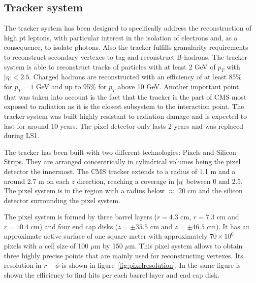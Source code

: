 \subsection{Tracker system}
\label{sec:tracker}

The tracker system has been designed to specifically address the reconstruction of high pt leptons, with particular interest in the isolation of electrons and, as a consequence, to isolate photons. Also the tracker fulfills granularity requirements to reconstruct secondary vertexes to tag and reconstruct B-hadrons. The tracker system is able to reconstruct tracks of particles with at least 2 GeV of $p_{T}$ with $|\eta|<2.5$. Charged hadrons are reconstructed with an efficiency of at least 85\% for $p_{T}=1$ GeV and up to 95\% for $p_{T}$ above 10 GeV. Another important point that was taken into account is the fact that the tracker is the part of CMS most exposed to radiation as it is the closest subsystem to the interaction point. The tracker system was built highly resistant to radiation damage and is expected to last for around 10 years. The pixel detector only lasts 2 years and was replaced during LS1. 

The tracker has been built with two different technologies: Pixels and Silicon Strips. They are arranged concentrically in cylindrical volumes being the pixel detector the innermost. The CMS tracker extends to a radius of 1.1 m and a around 2.7 m on each $z$ direction, reaching a coverage in $|\eta|$ between 0 and 2.5. The pixel system is in the region with a radius below $\approx$ 20 cm and the silicon detector surrounding the pixel system. %

The pixel system is formed by three barrel layers ($r=4.3$ cm, $r=7.3$ cm and $r=10.4$ cm) and four end cap disks ($z=\pm 35.5$ cm and $z=\pm 46.5$ cm). It has an approximate active surface of one square meter with approximately $70\times10^{6}$ pixels with a cell size of 100 $\mu$m by 150 $\mu$m. This pixel system allows to obtain three highly precise points that are mainly used for reconstructing vertexes. Its resolution in $r-\phi$ is shown in figure~\ref{fig:pixelresolution}. In the same figure is shown the efficiency to find hits per each barrel layer and end cap disk. 

